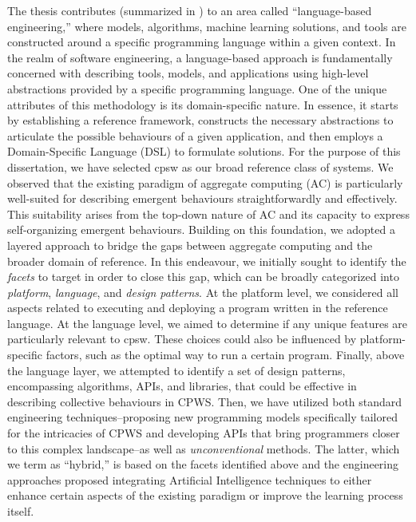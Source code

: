 \begin{refsection}
The thesis contributes (summarized in ) to an area called ``language-based engineering,'' where models, algorithms, machine learning solutions, and tools are constructed around a specific programming language within a given context.
In the realm of software engineering, 
 a language-based approach is fundamentally concerned with describing tools, models, and applications using high-level abstractions provided by a specific programming language. 
 One of the unique attributes of this methodology is its domain-specific nature. 
 In essence, it starts by establishing a reference framework, 
 constructs the necessary abstractions to articulate the possible behaviours of a given application, 
 and then employs a Domain-Specific Language (DSL) to formulate solutions.
%
For the purpose of this dissertation, 
 we have selected \ac{cpsw} as our broad reference class of systems. 
 We observed that the existing paradigm of aggregate computing (AC) 
 is particularly well-suited for describing emergent behaviours straightforwardly and effectively. This suitability arises from the top-down nature of AC and its capacity to express self-organizing emergent behaviours.
%
Building on this foundation, 
 we adopted a layered approach to bridge the gaps between aggregate computing and the broader domain of reference. 
 In this endeavour, 
 we initially sought to identify the \emph{facets} to target in order to close this gap, 
 which can be broadly categorized into \emph{platform}, \emph{language}, and \emph{design patterns}. 
 At the platform level, 
 we considered all aspects related to executing and deploying a program written in the reference language. 
 At the language level, we aimed to determine if any unique features are particularly relevant to \ac{cpsw}. 
 These choices could also be influenced by platform-specific factors, 
 such as the optimal way to run a certain program. 
 Finally, above the language layer, 
 we attempted to identify a set of design patterns, encompassing algorithms, APIs, and libraries, 
 that could be effective in describing collective behaviours in CPWS.
 Then, we have utilized both standard engineering techniques--proposing new programming models specifically tailored for the intricacies of CPWS and developing APIs that bring programmers closer to this complex landscape--as well as \emph{unconventional} methods. 
 The latter, which we term as ``hybrid,'' 
 is based on the facets identified above and the engineering approaches proposed
 integrating Artificial Intelligence techniques 
 to either enhance certain aspects of the existing paradigm or improve the learning process itself.

\end{refsection}
